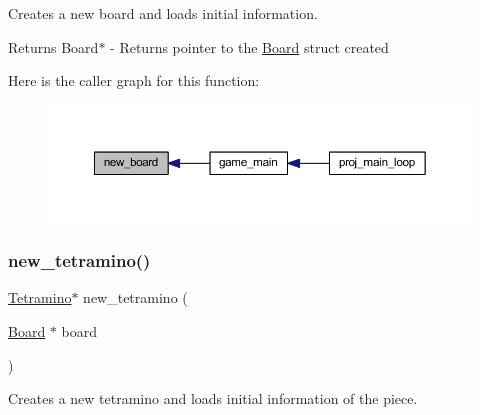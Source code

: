 Creates a new board and loads initial information. 

\begin{DoxyReturn}{Returns}
Board$\ast$ -\/ Returns pointer to the \mbox{\hyperlink{struct_board}{Board}} struct created 
\end{DoxyReturn}
Here is the caller graph for this function\+:
\nopagebreak
\begin{figure}[H]
\begin{center}
\leavevmode
\includegraphics[width=350pt]{group__tetramino_ga3d4977293a2989f9483b897b1a5bd073_icgraph}
\end{center}
\end{figure}
\mbox{\label{group__tetramino_ga9a2309ca24e8dec1a1bf31a995db2de1}} 
\subsubsection{\texorpdfstring{new\+\_\+tetramino()}{new\_tetramino()}}
{\footnotesize\ttfamily \mbox{\hyperlink{struct_tetramino}{Tetramino}}$\ast$ new\+\_\+tetramino (\begin{DoxyParamCaption}\item[{\mbox{\hyperlink{struct_board}{Board}} $\ast$}]{board }\end{DoxyParamCaption})}



Creates a new tetramino and loads initial information of the piece. 


